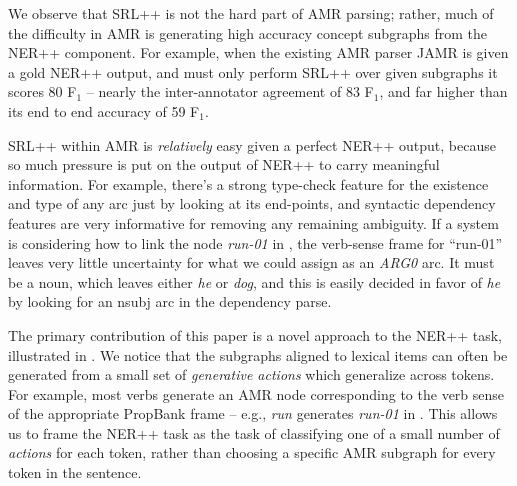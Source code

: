 \documentclass[11pt]{article}
\newcommand\w[1]{\textit{#1}} %
\newcommand\n[1]{\textit{#1}} %
\begin{document}
We observe that SRL++ is not the hard part of AMR parsing;
  rather, much of the difficulty in AMR is generating high accuracy concept
  subgraphs from the NER++ component.
For example, when the existing AMR parser JAMR \cite{2014flanigan-amr} is given a gold NER++ output, and must only perform SRL++ 
  over given subgraphs it scores 80 F$_1$ -- nearly the inter-annotator agreement of 83 F$_1$, and far higher than its end to end accuracy of 59 F$_1$.

SRL++ within AMR is \textit{relatively} easy given a perfect NER++ output, because so much pressure is put on the output of NER++ to carry meaningful information.
For example, there's a strong type-check feature for the existence and type of any arc just by looking at its end-points, and syntactic dependency features are very informative for removing any remaining ambiguity.
If a system is considering how to link the node \n{run-01} in , the verb-sense frame for ``run-01'' leaves very little uncertainty for what we could assign as an \w{ARG0} arc.
It must be a noun, which leaves either \w{he} or \w{dog}, and this is easily decided in favor of \w{he} by looking for an nsubj arc in the dependency parse.

The primary contribution of this paper is a novel approach to the NER++ task, illustrated in . We notice that the subgraphs aligned to lexical items can often be generated from a small set of \textit{generative actions} which generalize across tokens. For example, most verbs generate an AMR node corresponding to the verb sense of the appropriate PropBank frame -- e.g., \w{run} generates \n{run-01} in . This allows us to frame the NER++ task as the task of classifying one of a small number of \textit{actions} for each token, rather than choosing a specific AMR subgraph for every token in the sentence.
\end{document}
